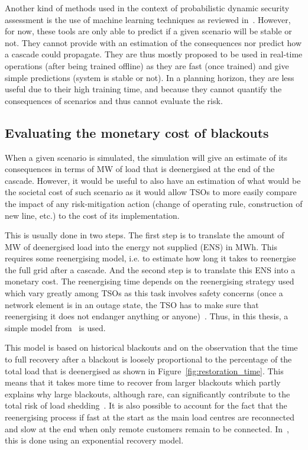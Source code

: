 Another kind of methods used in the context of probabilistic dynamic security assessment is the use of machine learning techniques as reviewed in~\cite{MLEfthymios}. However, for now, these tools are only able to predict if a given scenario will be stable or not. They cannot provide with an estimation of the consequences nor predict how a cascade could propagate. They are thus mostly proposed to be used in real-time operations (after being trained offline) as they are fast (once trained) and give simple predictions (system is stable or not). In a planning horizon, they are less useful due to their high training time, and because they cannot quantify the consequences of scenarios and thus cannot evaluate the risk.


\subsection{Evaluating the monetary cost of blackouts}
\label{sec:blackout_cost}

When a given scenario is simulated, the simulation will give an estimate of its consequences in terms of MW of load that is deenergised at the end of the cascade. However, it would be useful to also have an estimation of what would be the societal cost of such scenario as it would allow TSOs to more easily compare the impact of any risk-mitigation action (change of operating rule, construction of new line, etc.) to the cost of its implementation.

This is usually done in two steps. The first step is to translate the amount of MW of deenergised load into the energy not supplied (ENS) in MWh. This requires some reenergising model, i.e. to estimate how long it takes to reenergise the full grid after a cascade. And the second step is to translate this ENS into a monetary cost. The reenergising time depends on the reenergising strategy used which vary greatly among TSOs as this task involves safety concerns (once a network element is in an outage state, the TSO has to make sure that reenergising it does not endanger anything or anyone)~\cite{ENTSOE-PSA_second_report}. Thus, in this thesis, a simple model from~\cite{TwoLevelPSA} is used.

This model is based on historical blackouts and on the observation that the time to full recovery after a blackout is loosely proportional to the percentage of the total load that is deenergised as shown in Figure~\ref{fig:restoration_time}. This means that it takes more time to recover from larger blackouts which partly explains why large blackouts, although rare, can significantly contribute to the total risk of load shedding~\cite{CascadingMethodoAndChallenges}. It is also possible to account for the fact that the reenergising process if fast at the start as the main load centres are reconnected and slow at the end when only remote customers remain to be connected. In~\cite{TwoLevelPSA}, this is done using an exponential recovery model.

